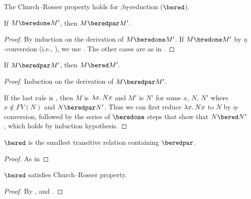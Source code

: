 \documentclass[../../../include/open-logic-section]{subfiles}
\begin{document}


The Church--Rosser property holds for
$\beta\eta$-reduction ($\bered$).

\begin{lem}
  If $M \beredone M'$, then $M \beredpar M'$.
\end{lem}

\begin{proof} 
  By induction on the derivation of $M \beredone M'$. If $M \bredone
  M'$ by $\eta$-conversion (i.e., ), we
  use . The other cases are as in
  .
\end{proof}


\begin{lem}
  If $M \beredpar M'$, then $M \bered M'$.
\end{lem}

\begin{proof} Induction on the derivation of $M \beredpar M'$.

  If the last rule is , then $M$ is
  $\lambd[x][Nx]$ and $M'$ is $N'$ for some $x$, $N$, $N'$ where $x
  \notin FV(N)$ and $N \beredpar N'$. Thus we can first reduce
  $\lambd[x][Nx]$ to $N$ by $\eta$-conversion, followed
  by the series of $\beredone$ steps that show that $N \bered N'$,
  which  holds by induction hypothesis.
\end{proof}


\begin{lem}
  $\bered$ is the smallest transitive relation containing $\beredpar$.
\end{lem}

\begin{proof}
  As in 
\end{proof}

\begin{thm}
  $\bered$ satisfies Church--Rosser property.
\end{thm}

\begin{proof}
  By ,  and .
\end{proof}
\end{document}
